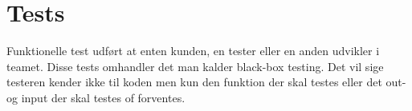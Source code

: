 \section{Tests}\label{sec:tests}
Funktionelle test udført at enten kunden, en tester eller en anden udvikler i teamet. Disse tests omhandler det man kalder 
black-box testing. Det vil sige testeren kender ikke til koden men kun den funktion der skal testes eller det out- og input der skal testes of forventes. 